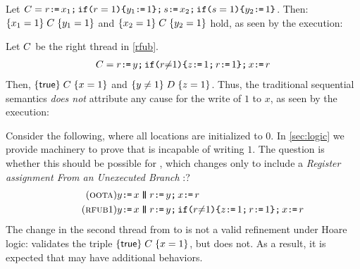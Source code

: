 Let $C = r \texttt{:}\mkern-1mu\texttt{=}\, x_1 \texttt{;}\,\allowbreak \texttt{if}\allowbreak\texttt{(}r=1\texttt{)} \allowbreak\texttt{\{} y_1 \texttt{:}\mkern-1mu\texttt{=}\, 1 \texttt{\}} \texttt{;}\,\allowbreak s \texttt{:}\mkern-1mu\texttt{=}\, x_2 \texttt{;}\,\allowbreak \texttt{if}\allowbreak\texttt{(}s=1\texttt{)} \allowbreak\texttt{\{} y_2 \texttt{:}\mkern-1mu\texttt{=}\, 1 \texttt{\}}$.  Then:
$\{x_1=1\}\allowbreak\;C\;\allowbreak\{y_1=1\}$ and
$\{x_2=1\}\allowbreak\;C\;\allowbreak\{y_2=1\}$
hold, as seen by the execution:
\begin{tikzdisplay}[node distance=1em]
\end{tikzdisplay}


Let $C$ be the right thread in \eqref{rfub}.
\begin{align*}
  C = r\texttt{:}\mkern-1mu\texttt{=}\, y\texttt{;}\,\allowbreak \texttt{if}\allowbreak\texttt{(}r {\neq} 1\texttt{)} \allowbreak\texttt{\{} z\texttt{:}\mkern-1mu\texttt{=}\, 1\texttt{;}\,\allowbreak r\texttt{:}\mkern-1mu\texttt{=}\, 1\texttt{\}}  \texttt{;}\,\allowbreak x\texttt{:}\mkern-1mu\texttt{=}\, r 
\end{align*}
Then, $\{\mathsf{true}\}\allowbreak\;C\;\allowbreak\{x=1\} $ and $\{y \neq 1\}\allowbreak\;D\;\allowbreak\{z=1\}$.  Thus, the traditional sequential semantics {\em does not} attribute any cause for the write of $1$ to $x$, as seen by the execution:
\begin{tikzdisplay}[node distance=1em]
\end{tikzdisplay}
Consider the
following, where all locations are initialized to $0$.  In \textsection\ref{sec:logic} we provide machinery to prove that \oota{} is
incapable of writing $1$.  The question is whether this should be possible
for \rfub, which changes \oota{} only to include a \emph{Register assignment
  From an Unexecuted Branch} \cite{BoehmOOTA}:?  
\begin{align*}
  \label{oota}  \tag{\textsc{oota}}
  y\GETS x
  \PAR&
  r\GETS y\SEMI
  x\GETS r
  \\
  \tag{\rfub1}
  \label{rfub}
  y\GETS x
  \PAR&
  r\GETS y\SEMI
  \IF{r \NOTEQ 1} \THEN z\GETS 1\SEMI r\GETS 1\FI  \SEMI x\GETS r 
\end{align*}
The change in the second
thread from \oota{} to \rfub{} is not a valid refinement under Hoare logic:
\rfub{} validates the triple $\{\mathsf{true}\}\allowbreak\;C\;\allowbreak\{x=1\}$, but \oota{} does
not.  As a result, it is expected that \rfub{} may have additional behaviors.


